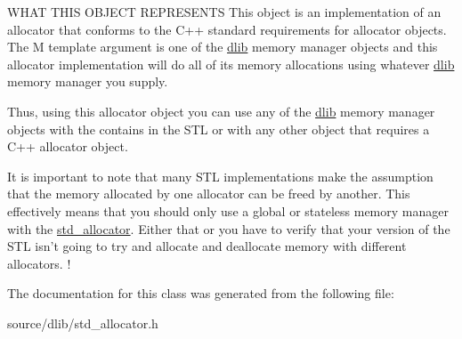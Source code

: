 WHAT THIS OBJECT REPRESENTS This object is an implementation of an allocator that conforms to the C++ standard requirements for allocator objects. The M template argument is one of the \hyperlink{namespacedlib}{dlib} memory manager objects and this allocator implementation will do all of its memory allocations using whatever \hyperlink{namespacedlib}{dlib} memory manager you supply.

Thus, using this allocator object you can use any of the \hyperlink{namespacedlib}{dlib} memory manager objects with the contains in the STL or with any other object that requires a C++ allocator object.

It is important to note that many STL implementations make the assumption that the memory allocated by one allocator can be freed by another. This effectively means that you should only use a global or stateless memory manager with the \hyperlink{classdlib_1_1std__allocator}{std\_\-allocator}. Either that or you have to verify that your version of the STL isn't going to try and allocate and deallocate memory with different allocators. ! 

The documentation for this class was generated from the following file:\begin{DoxyCompactItemize}
\item 
source/dlib/std\_\-allocator.h\end{DoxyCompactItemize}
